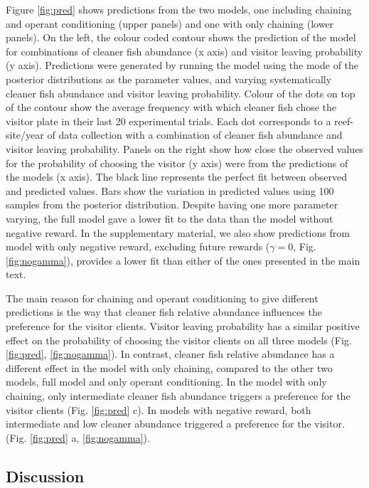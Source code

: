 \documentclass[]{rsos}%
\begin{document}
Figure \ref{fig:pred} shows predictions from the two models,
one including chaining and operant conditioning (upper panels) and
one with only chaining (lower panels). On the
left, the colour coded contour shows the prediction of the model for
combinations of cleaner fish abundance (x axis) and visitor leaving
probability (y axis). Predictions were generated by running the model
using the mode of the posterior distributions as the parameter values,
and varying systematically cleaner fish abundance and visitor leaving
probability. Colour of the dots on top of the contour show the average
frequency with which cleaner fish chose the visitor plate in their last
20 experimental trials. Each dot corresponds to a reef-site/year of
data collection with a combination of cleaner fish abundance
and visitor leaving probability. Panels
on the right show how close the observed values for the probability of
choosing the visitor (y axis) were from the predictions of the models (x
axis). The black line represents the perfect fit between observed and
predicted values. Bars show the variation in predicted values using 100
samples from the posterior distribution. Despite having one more
parameter varying, the full model
gave a lower fit to the data than the model without negative reward.
In the supplementary material, we also show predictions from
model with only negative reward, excluding future rewards (\(\gamma=0\),
Fig. \ref{fig:nogamma}), provides a lower fit than either of the ones
presented in the main text.

The main reason for chaining and operant conditioning to give different
predictions is the way that cleaner fish relative abundance influences the
preference for the visitor clients. Visitor leaving probability has a
similar positive effect on the probability of choosing the visitor
clients on all three models (Fig. \ref{fig:pred}, \ref{fig:nogamma}). In
contrast, cleaner fish relative abundance has a different effect in the
model with only chaining, compared to the other two models,
full model and only operant conditioning. In the model
with only chaining, only intermediate cleaner fish abundance triggers a
preference for the visitor clients (Fig. \ref{fig:pred} c). In models
with negative reward, both intermediate and low cleaner abundance
triggered a preference for the visitor. (Fig. \ref{fig:pred} a,
\ref{fig:nogamma}).

\hypertarget{discussion}{%
\subsection{Discussion}\label{discussion}}
\end{document}
